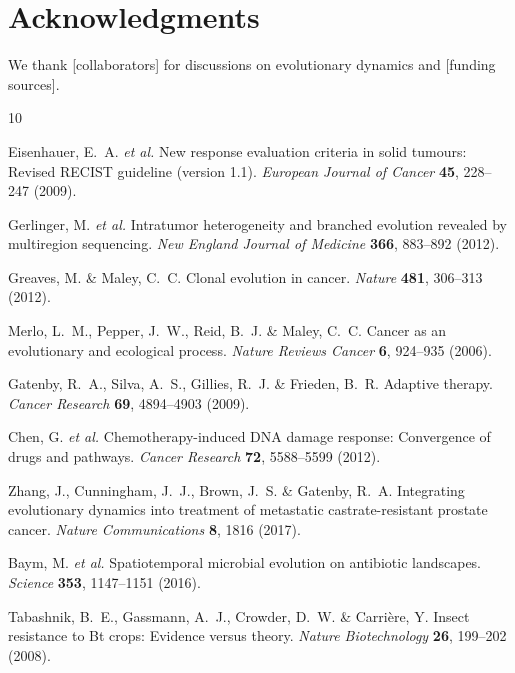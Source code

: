 \documentclass[11pt,a4paper]{article}
\begin{document}
\section*{Acknowledgments}

We thank [collaborators] for discussions on evolutionary dynamics and [funding sources].


\begin{thebibliography}{10}

Eisenhauer, E.~A. \textit{et al.}
\newblock New response evaluation criteria in solid tumours: Revised RECIST guideline (version 1.1).
\newblock \textit{European Journal of Cancer} \textbf{45}, 228--247 (2009).

Gerlinger, M. \textit{et al.}
\newblock Intratumor heterogeneity and branched evolution revealed by multiregion sequencing.
\newblock \textit{New England Journal of Medicine} \textbf{366}, 883--892 (2012).

Greaves, M. \& Maley, C.~C.
\newblock Clonal evolution in cancer.
\newblock \textit{Nature} \textbf{481}, 306--313 (2012).

Merlo, L.~M., Pepper, J.~W., Reid, B.~J. \& Maley, C.~C.
\newblock Cancer as an evolutionary and ecological process.
\newblock \textit{Nature Reviews Cancer} \textbf{6}, 924--935 (2006).

Gatenby, R.~A., Silva, A.~S., Gillies, R.~J. \& Frieden, B.~R.
\newblock Adaptive therapy.
\newblock \textit{Cancer Research} \textbf{69}, 4894--4903 (2009).

Chen, G. \textit{et al.}
\newblock Chemotherapy-induced DNA damage response: Convergence of drugs and pathways.
\newblock \textit{Cancer Research} \textbf{72}, 5588--5599 (2012).

Zhang, J., Cunningham, J.~J., Brown, J.~S. \& Gatenby, R.~A.
\newblock Integrating evolutionary dynamics into treatment of metastatic castrate-resistant prostate cancer.
\newblock \textit{Nature Communications} \textbf{8}, 1816 (2017).

Baym, M. \textit{et al.}
\newblock Spatiotemporal microbial evolution on antibiotic landscapes.
\newblock \textit{Science} \textbf{353}, 1147--1151 (2016).

Tabashnik, B.~E., Gassmann, A.~J., Crowder, D.~W. \& Carrière, Y.
\newblock Insect resistance to Bt crops: Evidence versus theory.
\newblock \textit{Nature Biotechnology} \textbf{26}, 199--202 (2008).


\end{thebibliography}
\end{document}
